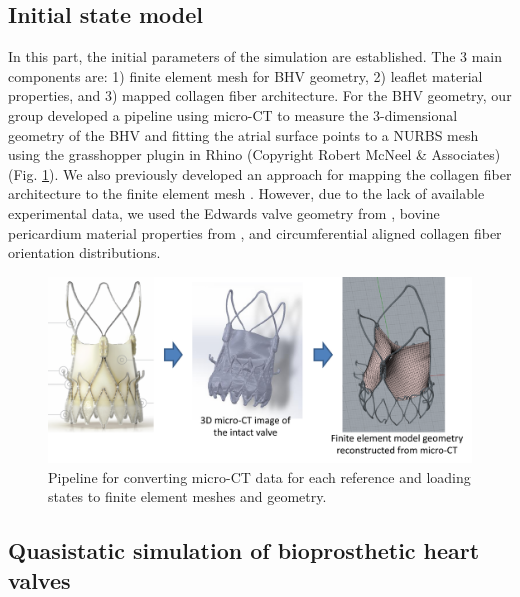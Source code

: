 \subsection{Initial state model}

    In this part, the initial parameters of the simulation are established. The 3 main components are: 1) finite element mesh for BHV geometry, 2) leaflet material properties, and 3) mapped collagen fiber architecture. For the BHV geometry, our group developed a pipeline using micro-CT to measure the 3-dimensional geometry of the BHV and fitting the atrial surface points to a NURBS mesh using the grasshopper plugin in Rhino (Copyright Robert McNeel \& Associates) (Fig. \ref{c6:fig:fegeometry}). We also previously developed an approach for mapping the collagen fiber architecture to the finite element mesh \cite{aggarwal_patient_2013,aggarwal_inverse_2015}. However, due to the lack of available experimental data, we used the Edwards valve geometry from \cite{aggarwal_inverse_2015}, bovine pericardium material properties from \cite{sacks_novel_2015}, and circumferential aligned collagen fiber orientation distributions.
    
\begin{figure}
\centering
\includegraphics[width=5.5in]{Images/chapter6/fegeometry.pdf}
\caption{Pipeline for converting micro-CT data for each reference and loading states to finite element meshes and geometry.}
\label{c6:fig:fegeometry}
\end{figure}

\subsection{Quasistatic simulation of bioprosthetic heart valves}

